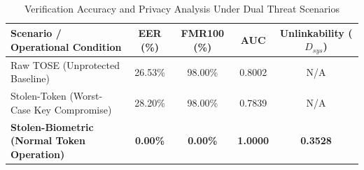 \begin{table}[t]
\centering
\caption{Verification Accuracy and Privacy Analysis Under Dual Threat Scenarios}
\label{tab:privacy}
\begin{tabular}{lcccc}
\hline
Scenario / Operational Condition & EER (\%) & FMR100 (\%) & AUC & Unlinkability ($D_{sys}$) \\
\hline
Raw TOSE (Unprotected Baseline) & 26.53\% & 98.00\% & 0.8002 & N/A \\
Stolen-Token (Worst-Case Key Compromise) & 28.20\% & 98.00\% & 0.7839 & N/A \\
\textbf{Stolen-Biometric (Normal Token Operation)} & \textbf{0.00\%} & \textbf{0.00\%} & \textbf{1.0000} & \textbf{0.3528} \\
\hline
\end{tabular}
\end{table}
